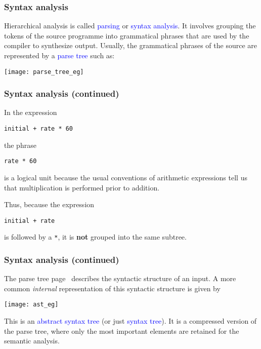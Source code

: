 \documentclass[compress,dvips,xcolor={dvipsnames},t]{beamer}
\begin{document}
% 
\begin{frame}
\frametitle{Syntax analysis}
\label{parse_tree_eg}


\vspace*{-4pt}

Hierarchical analysis is called \textcolor{blue}{parsing} or \textcolor{blue}{syntax
analysis}. It involves grouping the tokens of the source programme
into grammatical phrases that are used by the compiler to synthesize
output. Usually, the grammatical phrases of the source are represented
by a \textcolor{blue}{parse tree} such as:
\begin{center}
\texttt{[image: parse\_tree\_eg]}
\end{center}

\end{frame}

% 
\begin{frame}[containsverbatim]
\frametitle{Syntax analysis (continued)}


In the expression 
\begin{verbatim}
initial + rate * 60
\end{verbatim} 
the phrase
\begin{verbatim}
rate * 60
\end{verbatim} 
is a logical unit because the usual conventions of arithmetic
expressions tell us that multiplication is performed prior to
addition.

Thus, because the expression 
\begin{verbatim}
initial + rate
\end{verbatim}
is followed by a \verb+*+, it is \textbf{not} grouped into the same
subtree.

\end{frame}

% 
\begin{frame}
\frametitle{Syntax analysis (continued)}

\label{ast_eg}


The parse tree page~\pageref{parse_tree_eg} describes the syntactic
structure of an input. A more common \emph{internal} representation of
this syntactic structure is given by
\begin{center}
\texttt{[image: ast\_eg]}
\end{center}
This is an \textcolor{blue}{abstract syntax tree} (or just \textcolor{blue}{syntax
  tree}). It is a compressed version of the parse tree, where only the
most important elements are retained for the semantic analysis.

\end{frame}
\end{document}
